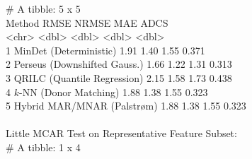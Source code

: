\documentclass[11pt,oneside]{book}
\begin{document}
\begin{routput}
\# A tibble: 5 x 5\\
\hspace*{1em}Method \hspace*{11.5em}RMSE NRMSE \hspace*{1em}MAE \hspace*{1.2em}ADCS\\
\hspace*{1em}\textless{}chr\textgreater{} \hspace*{13em}\textless{}dbl\textgreater{} \hspace*{0.8em}\textless{}dbl\textgreater{} \hspace*{1em}\textless{}dbl\textgreater{} \hspace*{1.2em}\textless{}dbl\textgreater{}\\
1 MinDet (Deterministic) \hspace*{4.2em}1.91 \hspace*{1.2em}1.40 \hspace*{1.2em}1.55 \hspace*{1.2em}0.371\\
2 Perseus (Downshifted Gauss.) \hspace*{1.2em}1.66 \hspace*{1.2em}1.22 \hspace*{1.2em}1.31 \hspace*{1.2em}0.313\\
3 QRILC (Quantile Regression) \hspace*{1.8em}2.15 \hspace*{1.2em}1.58 \hspace*{1.2em}1.73 \hspace*{1.2em}0.438\\
4 $k$-NN (Donor Matching) \hspace*{4.5em}1.88 \hspace*{1.2em}1.38 \hspace*{1.2em}1.55 \hspace*{1.2em}0.323\\
5 Hybrid MAR/MNAR (Palstr{\o}m) \hspace*{1.5em}1.88 \hspace*{1.2em}1.38 \hspace*{1.2em}1.55 \hspace*{1.2em}0.323\\
\\
Little MCAR Test on Representative Feature Subset:\\
\# A tibble: 1 x 4\\

\end{routput}
\end{document}
